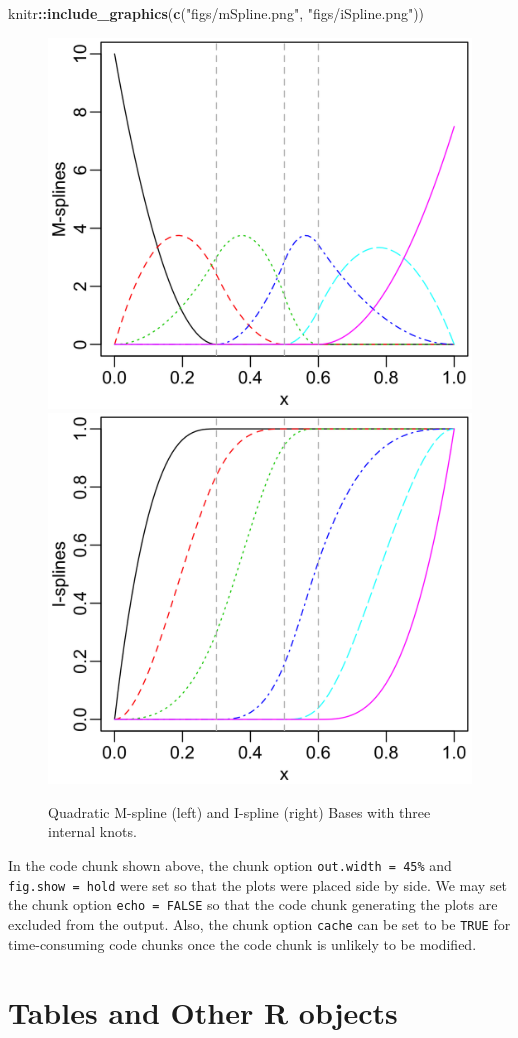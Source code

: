 \documentclass[11pt,letterpaper,]{article}
\newenvironment{Shaded}{\begin{snugshade}}{\end{snugshade}}
\newcommand{\KeywordTok}[1]{\textcolor[rgb]{0.13,0.29,0.53}{\textbf{#1}}}
\newcommand{\NormalTok}[1]{#1}
\newcommand{\OperatorTok}[1]{\textcolor[rgb]{0.81,0.36,0.00}{\textbf{#1}}}
\newcommand{\StringTok}[1]{\textcolor[rgb]{0.31,0.60,0.02}{#1}}
\theoremstyle{definition}
\theoremstyle{definition}
\theoremstyle{definition}
\theoremstyle{remark}
\begin{document}
\begin{Shaded}
\begin{Highlighting}[]
\NormalTok{knitr}\OperatorTok{::}\KeywordTok{include_graphics}\NormalTok{(}\KeywordTok{c}\NormalTok{(}\StringTok{"figs/mSpline.png"}\NormalTok{, }\StringTok{"figs/iSpline.png"}\NormalTok{))}
\end{Highlighting}
\end{Shaded}

\begin{figure}

{\centering \includegraphics[width=0.45\linewidth]{figs/mSpline} \includegraphics[width=0.45\linewidth]{figs/iSpline} 

}

\caption{Quadratic M-spline (left) and I-spline (right) Bases
with three internal knots.}\label{fig:miSplines}
\end{figure}

In the code chunk shown above, the chunk option
\texttt{out.width\ =\ \textquotesingle{}45\%\textquotesingle{}} and
\texttt{fig.show\ =\ \textquotesingle{}hold\textquotesingle{}} were set
so that the plots were placed side by side. We may set the chunk option
\texttt{echo\ =\ FALSE} so that the code chunk generating the plots are
excluded from the output. Also, the chunk option \texttt{cache} can be
set to be \texttt{TRUE} for time-consuming code chunks once the code
chunk is unlikely to be modified.

\hypertarget{sec:table}{%
\section{Tables and Other R objects}\label{sec:table}}
\end{document}
